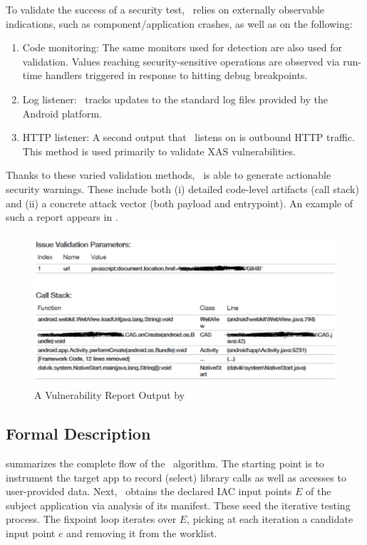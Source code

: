 To validate the success of a security test, \Tool\ relies on externally observable indications, such as component/application crashes, as well as on the following: 
\begin{enumerate}
	\item Code monitoring: The same monitors used for detection are also used for validation.
	Values reaching security-sensitive operations are observed via run-time handlers 
	triggered in response to hitting debug breakpoints.
	\item Log listener: \Tool\ tracks updates to the standard log files provided by the Android platform. 
	\item HTTP listener: A second output that \Tool\ listens on is outbound HTTP traffic. This method is used primarily to validate XAS vulnerabilities.
\end{enumerate} 
Thanks to these varied validation methods, \Tool\ is able to generate actionable security warnings. These include both (i) detailed code-level artifacts (call stack) and (ii) a concrete attack vector (both payload and entrypoint). An example of such a report appears in .

\begin{figure}
	\includegraphics[width=\columnwidth]{screenshot.pdf}
	\caption{\label{Fi:screenshot}A Vulnerability Report Output by \Tool}
\end{figure} 

\subsection{Formal Description}

 summarizes the complete flow of the \Tool\ algorithm. The starting point is to instrument the target app to record (select) library calls as well as accesses to user-provided data. Next, \Tool\ obtains the declared IAC input points $E$ of the subject application via analysis of its manifest. These seed the iterative testing process. The fixpoint loop iterates over $E$, picking at each iteration a candidate input point $e$ and removing it from the worklist.

